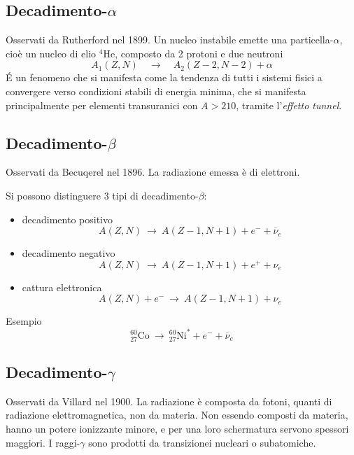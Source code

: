 \subsection{Decadimento-$\alpha$}
Osservati da Rutherford nel 1899.
Un nucleo instabile emette una particella-$\alpha$, cioè un nucleo di elio ${}^4 \text{He}$, composto da 2 protoni e due neutroni
\begin{equation}
    A_1(Z,N) \quad \rightarrow \quad A_2(Z-2,N-2) + \alpha
\end{equation}
\'E un fenomeno che si manifesta come la tendenza di tutti i sistemi fisici a convergere verso condizioni stabili di energia minima, che si manifesta principalmente per elementi transuranici con $A > 210$, tramite l'\textit{effetto tunnel}.
\subsection{Decadimento-$\beta$}
Osservati da Becuqerel nel 1896.
La radiazione emessa è di elettroni.

\noindent
Si possono distinguere 3 tipi di decadimento-$\beta$:
\begin{itemize}
    \item decadimento positivo
        \begin{equation}
            A(Z,N) \ \rightarrow \ A(Z-1,N+1) + e^- + \overline{\nu}_e
        \end{equation}
    \item decadimento negativo
        \begin{equation}
            A(Z,N) \ \rightarrow \ A(Z-1,N+1) + e^+ + \nu_e
        \end{equation}
    \item cattura elettronica
        \begin{equation}
            A(Z,N) + e^- \ \rightarrow \ A(Z-1,N+1) + \nu_e
        \end{equation}
\end{itemize}

\noindent
Esempio
\begin{equation}
    {}^{60}_{27} \text{Co} \ \rightarrow \ {}^{60}_{27} \text{Ni}^* + e^- + \overline{\nu}_e
\end{equation}
\subsection{Decadimento-$\gamma$}
Osservati da Villard nel 1900.
La radiazione è composta da fotoni, quanti di radiazione elettromagnetica, non da materia. Non essendo composti da materia, hanno un potere ionizzante minore, e per una loro schermatura servono spessori maggiori.
I raggi-$\gamma$ sono prodotti da transizionei nucleari o subatomiche.

